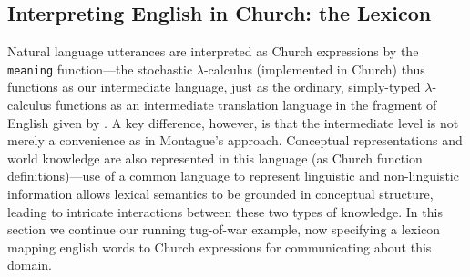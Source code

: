 \documentclass[pdfextras]{handbook}
\begin{document}







\subsection{Interpreting English in Church: the Lexicon}
\label{lexicon}
Natural language utterances are interpreted as Church expressions by the \lstinline{meaning} function---the stochastic $\lambda$-calculus (implemented in Church) thus functions as our intermediate language, just as the ordinary, simply-typed $\lambda$-calculus functions as an intermediate translation language in the fragment of English given by \citet{montague1973}. 
A key difference, however, is that the intermediate level is not merely a convenience as in Montague's approach. 
Conceptual representations and world knowledge are also represented in this language (as Church function definitions)---use of a common language to represent linguistic and non-linguistic information allows lexical semantics to be grounded in conceptual structure, leading to intricate interactions between these two types of knowledge. In this section we continue our running tug-of-war example, now specifying a lexicon mapping english words to Church expressions for communicating about this domain.
\end{document}
